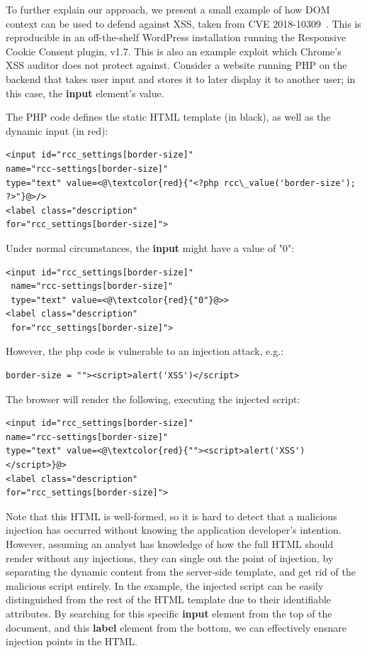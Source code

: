 To further explain our approach, we present a small example of how
DOM context can be used to defend against XSS, taken from CVE
2018-10309~\cite{examplecve}. This is reproducible in an off-the-shelf
WordPress installation running the Responsive Cookie Consent plugin,
v1.7. This is also an example exploit which Chrome's XSS auditor does
not protect against. Consider a website running PHP on the backend
that takes user input and stores it to later display it to another
user; in this case, the \textbf{input} element's value.

The PHP code defines the static HTML template (in black), as well as the dynamic input (in red):

\begin{lstlisting}
<input id="rcc_settings[border-size]" 
name="rcc-settings[border-size]" 
type="text" value=<@\textcolor{red}{"<?php rcc\_value('border-size'); ?>"}@>/>
<label class="description"
for="rcc_settings[border-size]">
\end{lstlisting}
Under normal circumstances, the \textbf{input} might have a value of "0":
\begin{lstlisting}
<input id="rcc_settings[border-size]" 
 name="rcc-settings[border-size]" 
 type="text" value=<@\textcolor{red}{"0"}@>>
<label class="description"
 for="rcc_settings[border-size]">
\end{lstlisting}
However, the php code is vulnerable to an injection attack, e.g.:
\begin{lstlisting}
border-size = ""><script>alert('XSS')</script>
\end{lstlisting}
The browser will render the following, executing the injected script:
\begin{lstlisting}
<input id="rcc_settings[border-size]" 
name="rcc-settings[border-size]" 
type="text" value=<@\textcolor{red}{""><script>alert('XSS')</script>}@>
<label class="description"
for="rcc_settings[border-size]">
\end{lstlisting}

Note that this HTML is well-formed, so it is hard to detect that a malicious injection has occurred without knowing the application developer's intention. However, assuming an analyst has knowledge of how the full HTML should render without any injections, they can single out the point of injection, by separating the dynamic content from the server-side template, and get rid of the malicious script entirely. In the example, the injected script can be easily distinguished from the rest of the HTML template due to their identifiable attributes. By searching for this specific \textbf{input} element from the top of the document, and this \textbf{label} element from the bottom, we can effectively ensnare injection points in the HTML. 

